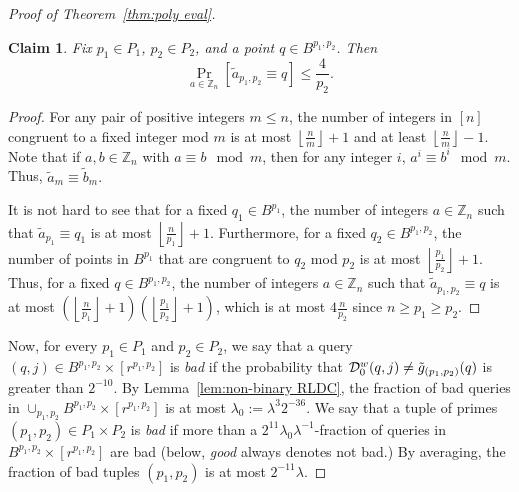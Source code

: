\documentclass[11pt,english]{article}
\newtheorem{claim}[theorem]{Claim}
\theoremstyle{definition}
\theoremstyle{remark}
\newcommand{\D}{{\cal D}}
\newcommand{\Z}{\mathbb{Z}}
\begin{document}
\begin{proof}[Proof of Theorem~\ref{thm:poly eval}]
\begin{claim}\label{claim:crt-random}
Fix $p_{1}\in P_{1}$, $p_{2}\in P_{2}$, and a point
$q\in B^{p_{1},p_{2}}$. Then \[
\Pr_{a\in\Z_{n}}\left[\tilde{a}_{p_{1},p_{2}}\equiv q\right]\leq\frac{4}{p_{2}}.\]
\end{claim}

\begin{proof} For any pair of positive integers $m\leq n$, the number
of integers in $[n]$ congruent to a fixed integer mod $m$ is at
most $\left\lfloor \frac{n}{m}\right\rfloor +1$ and at least $\left\lfloor \frac{n}{m}\right\rfloor -1$. 
Note that if $a,b\in\Z_{n}$ with $a\equiv b\mod m$, then for any integer $i$, $a^{i}\equiv b^{i}\mod m$.
Thus, $\tilde{a}_{m}\equiv\tilde{b}_{m}.$ 

It is not hard to see that for a fixed $q_{1}\in B^{p_{1}}$,
the number of integers $a\in\Z_{n}$ such that ${\tilde{a}}_{p_{1}}\equiv q_{1}$
is at most $\left\lfloor \frac{n}{p_{1}}\right\rfloor +1$. Furthermore,
for a fixed $q_{2}\in B^{p_{1},p_{2}}$, the number of points in $B^{p_{1}}$
that are congruent to $q_{2}$ mod $p_{2}$ is at most $\left\lfloor \frac{p_{1}}{p_{2}}\right\rfloor +1$.
Thus, for a fixed $q\in B^{p_{1},p_{2}}$, the number of integers
$a\in\Z_{n}$ such that ${\tilde{a}}_{p_{1},p_{2}}\equiv q$ is at
most $\left(\left\lfloor \frac{n}{p_{1}}\right\rfloor +1\right)\left(\left\lfloor \frac{p_{1}}{p_{2}}\right\rfloor +1\right)$,
which is at most $4\frac{n}{p_{2}}$ since $n\geq p_{1}\geq p_{2}$.
\end{proof}

Now, for every $p_{1}\in P_{1}$ and $p_{2}\in P_{2}$, we say that
a query $(q,j)\in B^{p_{1},p_{2}}\times[r^{p_{1},p_{2}}]$ is \emph{bad}
if the probability that $\D_{0}^{w}(q,j)\neq{\tilde{g}}_{(p_{1},p_{2})}(q)$
is greater than $2^{-10}$. By Lemma~\ref{lem:non-binary RLDC},
the fraction of bad queries in $\cup_{p_{1},p_{2}}B^{p_{1},p_{2}}\times[r^{p_{1},p_{2}}]$
is at most $\lambda_0:=\lambda^3 2^{-36}$. We say that a tuple of primes
$(p_{1},p_{2})\in P_{1}\times P_{2}$ is \emph{bad} if more than a $2^{11}\lambda_0\lambda^{-1}$-fraction
of queries in $B^{p_{1},p_{2}}\times[r^{p_{1},p_{2}}]$ are bad (below,
\emph{good} always denotes not bad.) By averaging, the fraction of
bad tuples $(p_{1},p_{2})$ is at most $2^{-11}\lambda$.


\end{proof}
\end{document}

